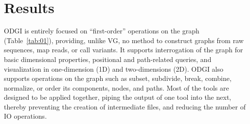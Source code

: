 \documentclass{bioinfo}
\begin{document}
\begin{methods}
%
%
%
%

    \end{methods}


    \section{Results}

    ODGI is entirely focused on “first-order” operations on the graph (Table~\ref{tab:01}), providing, unlike VG, no
    method to construct graphs from raw sequences, map reads, or call variants. It supports interrogation of the graph
    for basic dimensional properties, positional and path-related queries, and visualization in one-dimension (1D) and
    two-dimensions (2D). ODGI also supports operations on the graph such as subset, subdivide, break, combine,
    normalize, or order its components, nodes, and paths. Most of the tools are designed to be applied together,
    piping the output of one tool into the next, thereby preventing the creation of intermediate files, and reducing
    the number of IO operations.
\end{document}
